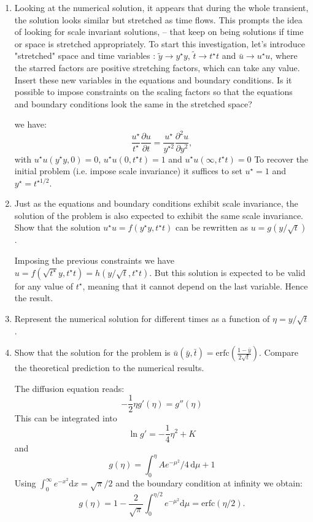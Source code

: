 \documentclass[11pt,a4paper]{article}
\newcommand{\pd}[2]{\frac{\partial #1}{\partial #2}}
\begin{document}
\begin{enumerate}
\begin{answer}
\end{answer}
\item Looking at the numerical solution, it appears that during the whole transient, the solution looks similar but stretched as time flows. This prompts the idea of looking for scale invariant solutions, -- that keep on being solutions if time or space is stretched appropriately. To start this investigation, let's introduce "stretched" space and time variables : $\tilde y \to y^\star y$, $\tilde t \to t^\star t$ and $\bar u \to u^\star u$, where the starred factors are positive stretching factors, which can take any value. Insert these new variables in the equations and boundary conditions. Is it possible to impose constraints on the scaling factors so that the equations and boundary conditions look the same in the stretched space?
\begin{answer}
we have:
$$
\frac{u^\star}{t^\star}\pd{u}{t}=\frac{u^\star}{y^{\star 2}}\pd{^2 u}{y^2},
$$ 
with $u^\star u(y^\star y,0) = 0$, $u^\star u(0,t^\star t) = 1$ and $u^\star u(\infty,t^\star t) = 0$
To recover the initial problem (i.e. impose scale invariance) it suffices to set $u^\star = 1$ and $y^\star = t^{\star 1/2}$.
\end{answer}
\item Just as the equations and boundary conditions exhibit scale invariance, the solution of the problem is also expected to exhibit the same scale invariance. Show that the solution $u^\star u = f(y^\star y, t^\star t)$ can be rewritten as $u = g(y/\sqrt{t})$.
\begin{answer}
Imposing the previous constraints we have $u = f(\sqrt{t^\star} y, t^\star t) = h(y/\sqrt{t}, t^\star t)$. But this solution is expected to be valid for any value of $t^\star$, meaning that it cannot depend on the last variable. Hence the result.
\end{answer} 
\item Represent the numerical solution for different times as a function of $\eta = y/\sqrt{t}$.
\item Show that the solution for the problem is $\bar u(\bar y,\bar t) = \mathrm{erfc}\left(\frac{1-\bar y}{2 \sqrt{t}}\right)$. Compare the theoretical prediction to the numerical results.  
\begin{answer}
The diffusion equation reads:
$$
-\frac{1}{2}\eta g'(\eta) = g''(\eta)
$$
This can be integrated into
$$
\ln g' = -\frac{1}{4}\eta^2 + K
$$
and
$$
g(\eta) = \int_0^\eta A e^{-\mu^2}/4 \, \mathrm d\mu + 1
$$
Using $\int_0^\infty e^{-x^2} \mathrm dx = \sqrt{\pi}/2$ and the boundary condition at infinity we obtain:
$$
g(\eta) = 1 - \frac{2}{\sqrt{\pi}}\int_0^{\eta/2}e^{-\mu^2} \mathrm d\mu = \mathrm{erfc}(\eta/2).
$$
\end{answer}
\end{enumerate}
\end{document}
